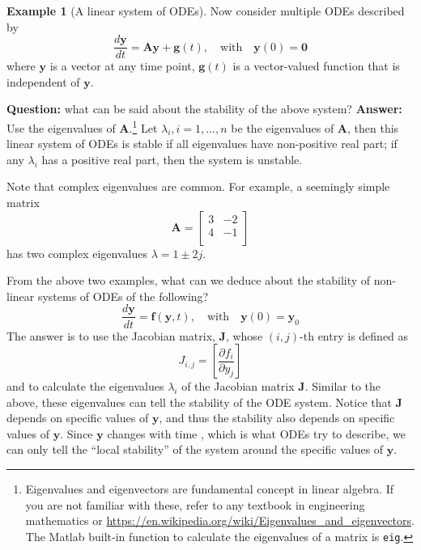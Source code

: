 \documentclass[a4paper,11pt]{article}
\newcommand{\bm}{\mathbf}
\theoremstyle{definition}
\newtheorem{exmp}{Example}[section]
\begin{document}
\begin{exmp}[A linear system of ODEs]
\label{exmp:stab_linear_systems}
Now consider multiple ODEs described by
\begin{equation} \label{eq:stab_lin}
	\frac{d \bm y}{d t} = \bm A \bm y + \bm g(t), \quad \textrm{with} \quad \bm y(0) = \bm 0
\end{equation}
\noindent where $\bm y$ is a vector at any time point, $\bm g(t)$ is a vector-valued function that is independent
of $\bm y$. 

\textbf{Question:} what can be said about the stability of the above system?
\textbf{Answer:} Use the eigenvalues of $\bm A$.\footnote{Eigenvalues and eigenvectors are fundamental concept
in linear algebra. If you are not familiar with these, refer to any textbook in engineering mathematics
or \url{https://en.wikipedia.org/wiki/Eigenvalues_and_eigenvectors}. The Matlab built-in function to calculate
the eigenvalues of a matrix is \texttt{eig}.}
Let $\lambda_i, i=1,\ldots, n$ be the eigenvalues of $\bm A$, then this linear system of ODEs is stable if
all eigenvalues have non-positive real part; if any $\lambda_i$ has a positive real part, then the system is unstable.

Note that complex eigenvalues are common. For example, a seemingly simple matrix
\[
	\bm A = \left[ \begin{array}{cc}
		3 & -2 \\
		4 & -1 \\ \end{array} \right]
\]
\noindent has two complex eigenvalues $\lambda = 1\pm 2j$.
\end{exmp}

From the above two examples, what can we deduce about the stability of non-linear systems of ODEs of the following?
\begin{equation}  \label{eq:stab_nonlin}
	\frac{d \bm y}{d t} = \bm f( \bm y, t), \quad \textrm{with} \quad \bm y(0) = \bm y_0
\end{equation}
\noindent The answer is to use the Jacobian matrix, $\bm J$, whose $(i,j)$-th entry is defined as
\begin{equation} 
	J_{i,j} = \left[ \frac{\partial f_i}{\partial y_j} \right]
\end{equation}
\noindent and to calculate the eigenvalues $\lambda_i$ of the Jacobian matrix $\bm J$.
Similar to the above, these eigenvalues can tell the stability of the ODE system.
Notice that $\bm J$ depends on specific values of $\bm y$, and thus the stability also depends on
specific values of $\bm y$. Since $\bm y$ changes with time , which is what ODEs try to describe,
we can only tell the ``local stability'' of the system around the specific values of $\bm y$.
\end{document}
